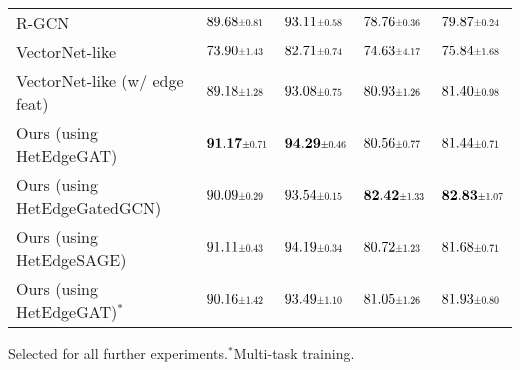 \documentclass[letterpaper, 10 pt, journal, twoside]{IEEEtran}
\newcommand\scalemath[2]{\scalebox{#1}{\mbox{\ensuremath{\displaystyle #2}}}}
\begin{document}
\begin{table}[!t]
\begin{tabularx}{\columnwidth}{Xllll}
		R-GCN \cite{Schlichtkrull2018}               & $89.68\scalemath{0.7}{\pm 0.81}$          & $93.11\scalemath{0.7}{\pm 0.58}$          & $78.76\scalemath{0.7}{\pm 0.36}$          & $79.87\scalemath{0.7}{\pm 0.24}$          \\
		VectorNet-like \cite{Gao2020}                & $73.90\scalemath{0.7}{\pm 1.43}$          & $82.71\scalemath{0.7}{\pm 0.74}$          & $74.63\scalemath{0.7}{\pm 4.17}$          & $75.84\scalemath{0.7}{\pm 1.68}$          \\
		VectorNet-like (w/ edge feat) \cite{Gao2020} & $89.18\scalemath{0.7}{\pm 1.28}$          & $93.08\scalemath{0.7}{\pm 0.75}$          & $80.93\scalemath{0.7}{\pm 1.26}$          & $81.40\scalemath{0.7}{\pm 0.98}$          \\ \midrule
		Ours (using HetEdgeGAT)\footnotemark         & $\mathbf{91.17}\scalemath{0.7}{\pm 0.71}$ & $\mathbf{94.29}\scalemath{0.7}{\pm 0.46}$ & $80.56\scalemath{0.7}{\pm 0.77}$          & $81.44\scalemath{0.7}{\pm 0.71}$          \\
		Ours (using HetEdgeGatedGCN)                 & $90.09\scalemath{0.7}{\pm 0.29}$          & $93.54\scalemath{0.7}{\pm 0.15}$          & $\mathbf{82.42}\scalemath{0.7}{\pm 1.33}$ & $\mathbf{82.83}\scalemath{0.7}{\pm 1.07}$ \\
		Ours (using HetEdgeSAGE)                     & $91.11\scalemath{0.7}{\pm 0.43}$          & $94.19\scalemath{0.7}{\pm 0.34}$          & $80.72\scalemath{0.7}{\pm 1.23}$          & $81.68\scalemath{0.7}{\pm 0.71}$          \\
		Ours (using HetEdgeGAT)$^*$                  & $90.16\scalemath{0.7}{\pm 1.42}$          & $93.49\scalemath{0.7}{\pm 1.10}$          & $81.05\scalemath{0.7}{\pm 1.26}$          & $81.93\scalemath{0.7}{\pm 0.80}$          \\ \bottomrule
	\end{tabularx}
	\begin{flushleft}
	\footnotemark[1]Selected for all further experiments.\quad $^*$Multi-task training.
	\end{flushleft}
	\vspace{-0.3cm}
\end{table}
 
\end{document}
